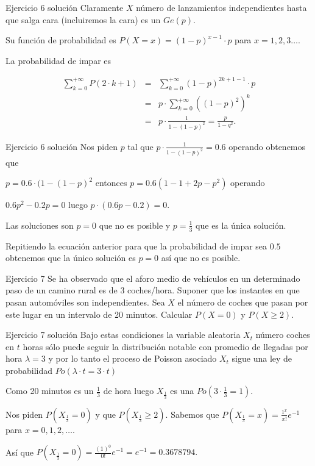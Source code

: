 \documentclass[
  ignorenonframetext,
]{beamer}
\begin{document}
\begin{frame}{Ejercicio 6 solución}
\protect\hypertarget{ejercicio-6-soluciuxf3n}{}
Claramente \(X\) número de lanzamientos independientes hasta que salga
cara (incluiremos la cara) es un \(Ge(p)\).

Su función de probabilidad es \(P(X=x)=(1-p)^{x-1}\cdot p\) para
\(x=1,2,3\ldots.\)

La probabilidad de impar es

\[
\begin{array}{lll}
\sum_{k=0}^{+\infty}P(2\cdot k +1) & = & \sum_{k=0}^{+\infty} (1-p)^{2k+1-1}\cdot p\\ &=&
p \cdot \sum_{k=0}^{+\infty} \left((1-p)^{2}\right)^k\\ &=&
p\cdot \frac{1}{1-(1-p)^2}= 
\frac{p}{1-q^2}.
\end{array}
\]
\end{frame}

\begin{frame}{Ejercicio 6 solución}
\protect\hypertarget{ejercicio-6-soluciuxf3n-1}{}
Nos piden \(p\) tal que \(p\cdot \frac{1}{1-(1-p)^2}=0.6\) operando
obtenemos que

\(p=0.6\cdot (1-(1-p)^2\) entonces \(p=0.6\left(1-1+2 p-p^2\right)\)
operando

\(0.6 p^2-0.2 p=0\) luego \(p \cdot (0.6 p -0.2)=0\).

Las soluciones son \(p=0\) que no es posible y \(p=\frac{1}{3}\) que es
la única solución.

Repitiendo la ecuación anterior para que la probabilidad de impar sea
\(0.5\) obtenemos que la único solución es \(p=0\) así que no es
posible.
\end{frame}

\begin{frame}{Ejercicio 7}
\protect\hypertarget{ejercicio-7}{}
Se ha observado que el aforo medio de vehículos en un determinado paso
de un camino rural es de 3 coches/hora. Suponer que los instantes en que
pasan automóviles son independientes. Sea \(X\) el número de coches que
pasan por este lugar en un intervalo de 20 minutos. Calcular \(P(X=0)\)
y \(P(X\geq 2)\).
\end{frame}

\begin{frame}{Ejercicio 7 solución}
\protect\hypertarget{ejercicio-7-soluciuxf3n}{}
Bajo estas condiciones la variable aleatoria \(X_t\) número coches en
\(t\) horas sólo puede seguir la distribución notable con promedio de
llegadas por hora \(\lambda=3\) y por lo tanto el proceso de Poisson
asociado \(X_t\) sigue una ley de probabilidad
\(Po(\lambda \cdot t =3\cdot t)\)

Como 20 minutos es un \(\frac13\) de hora luego \(X_{\frac13}\) es una
\(Po(3\cdot \frac13=1)\).

Nos piden \(P(X_{\frac13}=0)\) y que
\(P\left(X_{\frac{1}{3}}\geq 2 \right)\). Sabemos que
\(P(X_{\frac13}=x)=\frac{1^x}{x!} e^{-1}\) para \(x=0,1,2,\ldots.\)

Así que \(P(X_{\frac13}=0)=\frac{(1)^0}{0!} e^{-1}=e^{-1}=0.3678794.\)
\end{frame}
\end{document}
